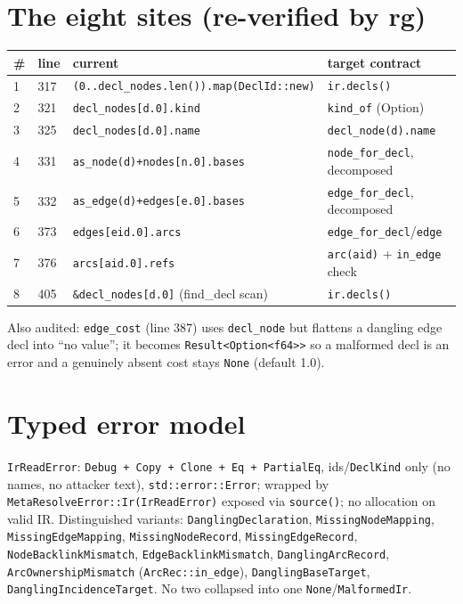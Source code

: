\documentclass[11pt]{article}
\begin{document}
\section{The eight sites (re-verified by rg)}
\begin{longtable}{llll}
\toprule
\# & line & current & target contract \\
\midrule
1 & 317 & \texttt{(0..decl\_nodes.len()).map(DeclId::new)} & \texttt{ir.decls()} \\
2 & 321 & \texttt{decl\_nodes[d.0].kind} & \texttt{kind\_of} (Option) \\
3 & 325 & \texttt{decl\_nodes[d.0].name} & \texttt{decl\_node(d).name} \\
4 & 331 & \texttt{as\_node(d)+nodes[n.0].bases} & \texttt{node\_for\_decl}, decomposed \\
5 & 332 & \texttt{as\_edge(d)+edges[e.0].bases} & \texttt{edge\_for\_decl}, decomposed \\
6 & 373 & \texttt{edges[eid.0].arcs} & \texttt{edge\_for\_decl}/\texttt{edge} \\
7 & 376 & \texttt{arcs[aid.0].refs} & \texttt{arc(aid)} + \texttt{in\_edge} check \\
8 & 405 & \texttt{\&decl\_nodes[d.0]} (find\_decl scan) & \texttt{ir.decls()} \\
\bottomrule
\end{longtable}
Also audited: \texttt{edge\_cost} (line 387) uses \texttt{decl\_node} but flattens a
dangling edge decl into ``no value''; it becomes
\texttt{Result<Option<f64>>} so a malformed decl is an error and a genuinely
absent cost stays \texttt{None} (default 1.0).

\section{Typed error model}
\texttt{IrReadError}: \texttt{Debug\,+\,Copy\,+\,Clone\,+\,Eq\,+\,PartialEq},
ids/\texttt{DeclKind} only (no names, no attacker text), \texttt{std::error::Error};
wrapped by \texttt{MetaResolveError::Ir(IrReadError)} exposed via \texttt{source()};
no allocation on valid IR. Distinguished variants: \texttt{DanglingDeclaration},
\texttt{MissingNodeMapping}, \texttt{MissingEdgeMapping}, \texttt{MissingNodeRecord},
\texttt{MissingEdgeRecord}, \texttt{NodeBacklinkMismatch}, \texttt{EdgeBacklinkMismatch},
\texttt{DanglingArcRecord}, \texttt{ArcOwnershipMismatch} (\texttt{ArcRec::in\_edge}),
\texttt{DanglingBaseTarget}, \texttt{DanglingIncidenceTarget}. No two collapsed
into one \texttt{None}/\texttt{MalformedIr}.
\end{document}
